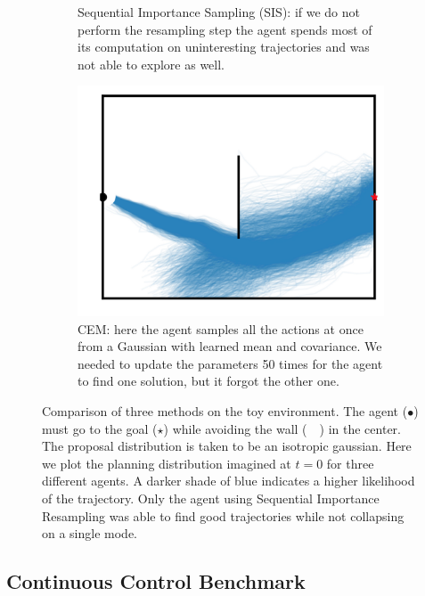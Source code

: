 \begin{figure}
\begin{subfigure}[t]{.295\textwidth}
\caption{Sequential Importance Sampling (SIS): if we do not perform the resampling step the agent spends most of its computation on uninteresting trajectories and was not able to explore as well.\vspace{1em}}
\label{fig:toy_sis}
\end{subfigure}\hspace{0.05\linewidth}
\begin{subfigure}[t]{.295\textwidth}
\centering
\includegraphics[width=\linewidth, trim={1.1cm 0cm .5cm 0cm},clip]{articles/smcp/figures/cem.png}
\caption{CEM: here the agent samples all the actions at once from a Gaussian with learned mean and covariance. We needed to update the parameters 50 times for the agent to find one solution, but it forgot the other one. }
\label{fig:toy_cem}
\end{subfigure}
\caption{Comparison of three methods on the toy environment. The agent ($\bullet$) must go to the goal ({\color{red}$\star$}) while avoiding the wall (\ \textbf{\textbar}\ ) in the center. The proposal distribution is taken to be an isotropic gaussian.  Here we plot the planning distribution imagined at $t=0$ for three different agents.  A darker shade of blue indicates a higher likelihood of the trajectory. Only the agent using Sequential Importance Resampling was able to find good trajectories while not collapsing on a single mode.}
\label{fig:toy}
\end{figure}

\subsection{Continuous Control Benchmark}
\label{sec:exp}

